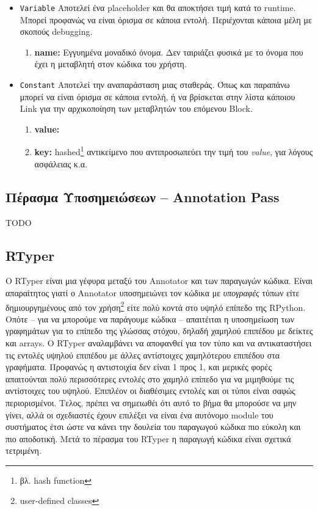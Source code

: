 \begin{itemize}
\item \texttt{Variable} Αποτελεί ένα placeholder και θα αποκτήσει τιμή κατά το
runtime. Μπορεί προφανώς να είναι όρισμα σε κάποια εντολή. Περιέχονται κάποια 
μέλη με σκοπούς debugging.

\begin{enumerate}
\item \textbf{name:} Εγγυημένα μοναδικό όνομα. Δεν ταιριάζει φυσικά με το όνομα 
που έχει η μεταβλητή στον κώδικα του χρήστη.
\end{enumerate}

\item \texttt{Constant} Αποτελεί την αναπαράσταση μιας σταθεράς. Όπως και 
παραπάνω μπορεί να είναι όρισμα σε κάποια εντολή, ή να βρίσκεται στην λίστα 
κάποιου Link για την αρχικοποίηση των μεταβλητών του επόμενου Block.

\begin{enumerate}
\item \textbf{value:}
\item \textbf{key:} hashed\footnote{βλ. hash function} αντικείμενο που 
αντιπροσωπεύει την τιμή του \textit{value}, για λόγους ασφάλειας κ.α.
\end{enumerate}

\end{itemize}

\subsection{Πέρασμα Υποσημειώσεων – Annotation Pass}

TODO

\subsection{RTyper}

Ο RTyper είναι μια γέφυρα μεταξύ του Annotator και των παραγωγών κώδικα. Είναι
απαραίτητος γιατί ο Annotator υποσημειώνει τον κώδικα με \textit{υπογραφές}
τύπων είτε δημιουργημένους από τον χρήση\footnote{user-defined classes} είτε
πολύ κοντά στο υψηλό επίπεδο της RPython. Οπότε – για να μπορούμε να παράγουμε
κώδικα – απαιτέιται η υποσημείωση των γραφημάτων για το επίπεδο της γλώσσας
στόχου, δηλαδή χαμηλού επιπέδου με δείκτες και arrays. Ο RTyper αναλαμβάνει να
αποφανθεί για τον τύπο και να αντικαταστήσει τις εντολές υψηλού επιπέδου με
άλλες αντίστοιχες χαμηλότερου επιπέδου στα γραφήματα. Προφανώς η αντιστοιχία δεν
είναι 1 προς 1, και μερικές φορές απαιτούνται πολύ περισσότερες εντολές στο
χαμηλό επίπεδο για να μιμηθούμε τις αντίστοιχες του υψηλού. Επιπλέον οι
διαθέσιμες εντολές και οι τύποι είναι σαφώς περιορισμένοι. Τελος, πρέπει να
σημειωθέι ότι αυτό το βήμα θα μπορούσε να μην γίνει, αλλά οι σχεδιαστές έχουν
επιλέξει να είναι ένα αυτόνομο module του συστήματος έτσι ώστε να κάνει την
δουλεία του παραγωγού κώδικα πιο εύκολη και πιο αποδοτική. Μετά το πέρασμα του
RTyper η παραγωγή κώδικα είναι σχετικά τετριμένη.

